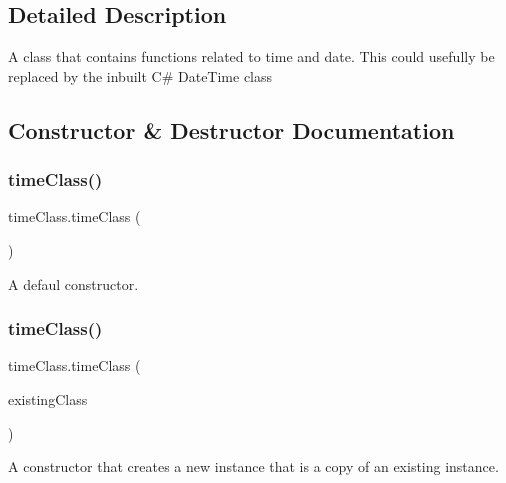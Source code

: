 \subsection{Detailed Description}
A class that contains functions related to time and date. This could usefully be replaced by the inbuilt C\# Date\+Time class 

\subsection{Constructor \& Destructor Documentation}
\mbox{\label{classtime_class_a38ce37ac715835464b8a4109bdb6510f}} 
\subsubsection{\texorpdfstring{timeClass()}{timeClass()}\hspace{0.1cm}{\footnotesize\ttfamily [1/2]}}
{\footnotesize\ttfamily time\+Class.\+time\+Class (\begin{DoxyParamCaption}{ }\end{DoxyParamCaption})\hspace{0.3cm}{\ttfamily [inline]}}



A defaul constructor. 

\mbox{\label{classtime_class_a2e9663011afb5016b7d5f19a0f3e620c}} 
\subsubsection{\texorpdfstring{timeClass()}{timeClass()}\hspace{0.1cm}{\footnotesize\ttfamily [2/2]}}
{\footnotesize\ttfamily time\+Class.\+time\+Class (\begin{DoxyParamCaption}\item[{\mbox{\hyperlink{classtime_class}{time\+Class}}}]{existing\+Class }\end{DoxyParamCaption})\hspace{0.3cm}{\ttfamily [inline]}}



A constructor that creates a new instance that is a copy of an existing instance. 


